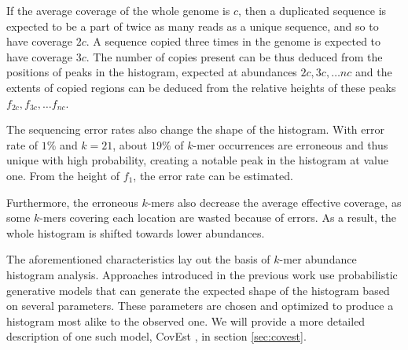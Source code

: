 \medskip

If the average coverage of the whole genome is $c$, then a duplicated sequence is expected 
to be a part of twice as many reads as a unique sequence, and so to have coverage $2c$. 
A sequence copied three times in the genome is expected to have coverage $3c$.
The number of copies present can be thus deduced from the positions of peaks in the histogram,
expected at abundances $2c, 3c, \dots nc$ and the extents of copied regions can be deduced
from the relative heights of these peaks $f_{2c}, f_{3c}, \dots f_{nc}$.

\medskip
 
The sequencing error rates also change the shape of the histogram. With error rate of $1\%$ 
and $k=21$, about $19\%$ of $k$-mer occurrences are erroneous and thus unique with high probability, 
creating a notable peak in the histogram at value one. From the height of $f_1$, the error rate
can be estimated. 

Furthermore, the erroneous $k$-mers also decrease the average effective coverage,
as some $k$-mers covering each location are wasted because of errors. As a result, the whole
histogram is shifted towards lower abundances.

\medskip

The aforementioned characteristics lay out the basis of $k$-mer abundance histogram analysis.
Approaches introduced in the previous work \cite{Hozza2015, Williams2013, Melsted2014,
Sivadasan2016} use probabilistic generative models that can generate the
expected shape of the histogram based on several parameters. These parameters are chosen
and optimized to produce a histogram most alike to the observed one.
We will provide a more detailed description of one such model, CovEst \cite{Hozza2015, Hozza2016},
in section \ref{sec:covest}.
